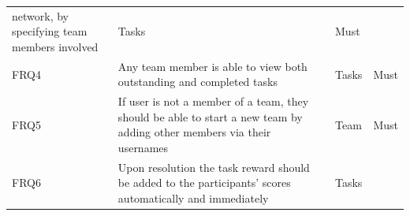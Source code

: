 \documentclass[12pt]{report}
\begin{document}
\begin{longtable}[]{@{}llll@{}}
\begin{minipage}[t]{0.64\columnwidth}
network, by specifying team members involved\strut
\end{minipage} & \begin{minipage}[t]{0.12\columnwidth}\raggedright\strut
Tasks\strut
\end{minipage} & \begin{minipage}[t]{0.09\columnwidth}\raggedright\strut
Must\strut
\end{minipage}\tabularnewline
\begin{minipage}[t]{0.04\columnwidth}\raggedright\strut
FRQ4\strut
\end{minipage} & \begin{minipage}[t]{0.64\columnwidth}\raggedright\strut
Any team member is able to view both outstanding and completed
tasks\strut
\end{minipage} & \begin{minipage}[t]{0.12\columnwidth}\raggedright\strut
Tasks\strut
\end{minipage} & \begin{minipage}[t]{0.09\columnwidth}\raggedright\strut
Must\strut
\end{minipage}\tabularnewline
\begin{minipage}[t]{0.04\columnwidth}\raggedright\strut
FRQ5\strut
\end{minipage} & \begin{minipage}[t]{0.64\columnwidth}\raggedright\strut
If user is not a member of a team, they should be able to start a new
team by adding other members via their usernames\strut
\end{minipage} & \begin{minipage}[t]{0.12\columnwidth}\raggedright\strut
Team\strut
\end{minipage} & \begin{minipage}[t]{0.09\columnwidth}\raggedright\strut
Must\strut
\end{minipage}\tabularnewline
\begin{minipage}[t]{0.04\columnwidth}\raggedright\strut
FRQ6\strut
\end{minipage} & \begin{minipage}[t]{0.64\columnwidth}\raggedright\strut
Upon resolution the task reward should be added to the participants'
scores automatically and immediately\strut
\end{minipage} & \begin{minipage}[t]{0.12\columnwidth}\raggedright\strut
Tasks\strut
\end{minipage} & \begin{minipage}[t]{0.09\columnwidth}\raggedright\strut

\end{minipage}
\end{longtable}
\end{document}
